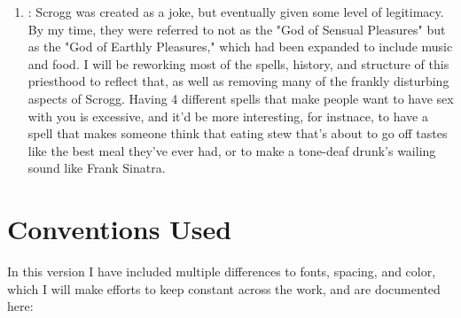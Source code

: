 \begin{enumerate}[leftmargin=12pt]
\item {}: Scrogg was created as a joke, but eventually given some level of legitimacy. By my time, they were referred to not as the "God of Sensual Pleasures" but as the "God of Earthly Pleasures," which had been expanded to include music and food. I will be reworking most of the spells, history, and structure of this priesthood to reflect that, as well as removing many of the frankly disturbing aspects of Scrogg. Having 4 different spells that make people want to have sex with you is excessive, and it'd be more interesting, for instnace, to have a spell that makes someone think that eating stew that's about to go off tastes like the best meal they've ever had, or to make a tone-deaf drunk's wailing sound like Frank Sinatra. 
\end{enumerate}
\section{Conventions Used}
In this version I have included multiple differences to fonts, spacing, and color, which I will make efforts to keep constant across the work, and are documented here:
